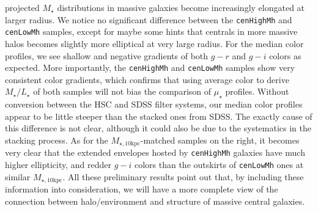 \documentclass{emulateapj}
\def\rbcg{\texttt{cenHighMh}}
\def\nbcg{\texttt{cenLowMh}}
\def\mstar{{$M_{\star}$}}
\def\minn{{$M_{\star,10\mathrm{kpc}}$}}
\def\m2l{{$M_{\star}/L_{\star}$}}
\def\mden{{$\mu_{\star}$}}
\begin{document}
\begin{CJK*}{UTF8}{gbsn}
    projected \mstar{} distributions in massive galaxies become increasingly elongated 
    at larger radius.  
    We notice no significant difference between the \rbcg{} and \nbcg{} samples, 
    except for maybe some hints that centrals in more massive halos becomes slightly 
    more elliptical at very large radius.  
    For the median color profiles, we see shallow and negative gradients of both 
    $g-r$ and $g-i$ colors as expected. 
    More importantly, the \rbcg{} and \nbcg{} samples show very consistent color 
    gradients, which confirms that using average color to derive \m2l{} of both 
    samples will not bias the comparison of \mden{} profiles.  
    Without conversion between the HSC and SDSS filter systems, our median color 
    profiles appear to be little steeper than the stacked ones from SDSS.  
    The exactly cause of this difference is not clear, although it could also be 
    due to the systematics in the stacking process. 
    As for the \minn{}-matched samples on the right, it becomes very clear that the 
    extended envelopes hosted by \rbcg{} galaxies have much higher ellipticity, and 
    redder $g-i$ colors than the outskirts of \nbcg{} ones at similar \minn{}.  
    All these preliminary results point out that, by including these information 
    into consideration, we will have a more complete view of the connection between 
    halo/environment and structure of massive central galaxies.    
    

\end{CJK*}
\end{document}
